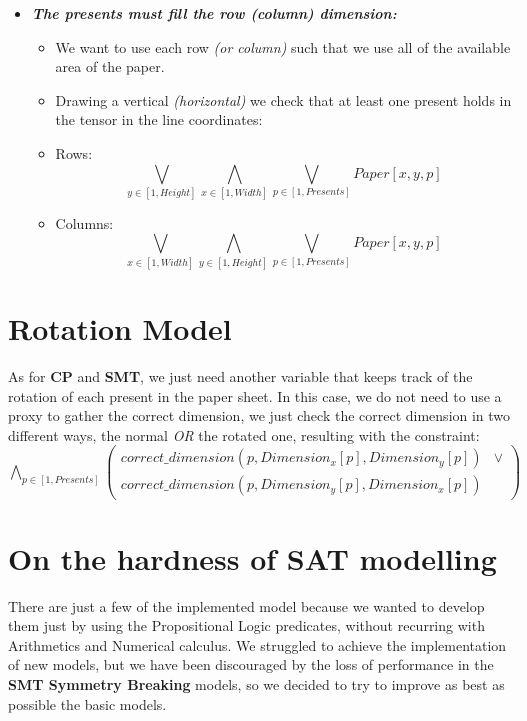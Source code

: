 \begin{itemize}
    \item \textbf{\textit{The presents must fill the row (column) dimension:}}
        \begin{itemize}
            \item[] We want to use each row \textit{(or column)} such that we use all of the available area of the paper.
            \item[] Drawing a vertical \textit{(horizontal)} we check that at least one present holds in the tensor in the line coordinates:
            \item[] Rows: \begin{equation*}\bigvee_{y \in [1, Height]} \bigwedge_{x \in [1, Width]} \bigvee_{p \in [1, Presents]} Paper[x, y, p]\end{equation*}
            \item[] Columns: \begin{equation*}\bigvee_{x \in [1, Width]} \bigwedge_{y \in [1, Height]} \bigvee_{p \in [1, Presents]} Paper[x, y, p]\end{equation*}
        \end{itemize}
\end{itemize}



\newpage
\section{Rotation Model}
As for \textbf{CP} and \textbf{SMT}, we just need another variable that keeps track of the rotation of each present in the paper sheet.
In this case, we do not need to use a proxy to gather the correct dimension, we just check the correct dimension in two different ways,
the normal \textit{OR} the rotated one, resulting with the constraint:
$
    \bigwedge_{p \in [1, Presents]} (
    \begin{matrix}
        correct\_dimension(p, Dimension_x[p], Dimension_y[p]) & \vee \\
        correct\_dimension(p, Dimension_y[p], Dimension_x[p]) &
    \end{matrix}
    )
$



\newpage
\section{On the hardness of SAT modelling}
There are just a few of the implemented model because we wanted to develop them just by using the Propositional Logic predicates, without recurring with Arithmetics
and Numerical calculus. We struggled to achieve the implementation of new models, but we have been discouraged by the loss of performance in the \textbf{SMT Symmetry Breaking} models,
so we decided to try to improve as best as possible the basic models.\\

